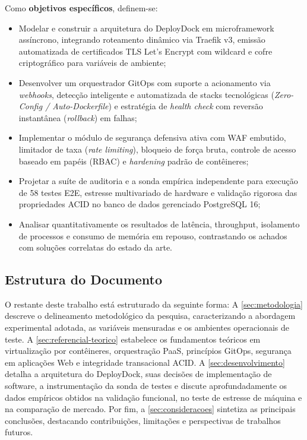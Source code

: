 Como \textbf{objetivos específicos}, definem-se:
\begin{itemize}
    \item Modelar e construir a arquitetura do DeployDock em microframework assíncrono, integrando roteamento dinâmico via Traefik v3, emissão automatizada de certificados TLS Let's Encrypt com wildcard e cofre criptográfico para variáveis de ambiente;
    \item Desenvolver um orquestrador GitOps com suporte a acionamento via \textit{webhooks}, detecção inteligente e automatizada de stacks tecnológicas (\textit{Zero-Config / Auto-Dockerfile}) e estratégia de \textit{health check} com reversão instantânea (\textit{rollback}) em falhas;
    \item Implementar o módulo de segurança defensiva ativa com WAF embutido, limitador de taxa (\textit{rate limiting}), bloqueio de força bruta, controle de acesso baseado em papéis (RBAC) e \textit{hardening} padrão de contêineres;
    \item Projetar a suíte de auditoria e a sonda empírica independente para execução de 58 testes E2E, estresse multivariado de hardware e validação rigorosa das propriedades ACID no banco de dados gerenciado PostgreSQL 16;
    \item Analisar quantitativamente os resultados de latência, throughput, isolamento de processos e consumo de memória em repouso, contrastando os achados com soluções correlatas do estado da arte.
\end{itemize}

\subsection{Estrutura do Documento}
\label{sec:estrutura-documento}

O restante deste trabalho está estruturado da seguinte forma:
A \autoref{sec:metodologia} descreve o delineamento metodológico da pesquisa, caracterizando a abordagem experimental adotada, as variáveis mensuradas e os ambientes operacionais de teste.
A \autoref{sec:referencial-teorico} estabelece os fundamentos teóricos em virtualização por contêineres, orquestração PaaS, princípios GitOps, segurança em aplicações Web e integridade transacional ACID.
A \autoref{sec:desenvolvimento} detalha a arquitetura do DeployDock, suas decisões de implementação de software, a instrumentação da sonda de testes e discute aprofundadamente os dados empíricos obtidos na validação funcional, no teste de estresse de máquina e na comparação de mercado.
Por fim, a \autoref{sec:consideracoes} sintetiza as principais conclusões, destacando contribuições, limitações e perspectivas de trabalhos futuros.
